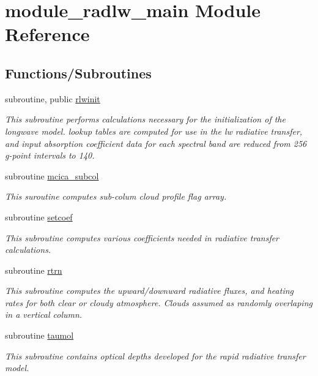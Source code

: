 \hypertarget{namespacemodule__radlw__main}{}\section{module\+\_\+radlw\+\_\+main Module Reference}
\label{namespacemodule__radlw__main}
\subsection*{Functions/\+Subroutines}
\begin{DoxyCompactItemize}
\item 
subroutine, public \hyperlink{group__module__radlw__main_ga916dc850de8c1d18ff9bfd6f63b65d30}{rlwinit}
\begin{DoxyCompactList}\small\item\em This subroutine performs calculations necessary for the initialization of the longwave model. lookup tables are computed for use in the lw radiative transfer, and input absorption coefficient data for each spectral band are reduced from 256 g-\/point intervals to 140. \end{DoxyCompactList}\item 
subroutine \hyperlink{group__module__radlw__main_ga378846d33b06ea00ba43d9c3b4c3a661}{mcica\+\_\+subcol}
\begin{DoxyCompactList}\small\item\em This suroutine computes sub-\/colum cloud profile flag array. \end{DoxyCompactList}\item 
subroutine \hyperlink{group__module__radlw__main_ga503a8d3f064dfb4cd4503ae98711bab8}{setcoef}
\begin{DoxyCompactList}\small\item\em This subroutine computes various coefficients needed in radiative transfer calculations. \end{DoxyCompactList}\item 
subroutine \hyperlink{group__module__radlw__main_gaa42d8cb56a431d3693d3db44733c11e3}{rtrn}
\begin{DoxyCompactList}\small\item\em This subroutine computes the upward/downward radiative fluxes, and heating rates for both clear or cloudy atmosphere. Clouds assumed as randomly overlaping in a vertical column. \end{DoxyCompactList}\item 
subroutine \hyperlink{group__module__radlw__main_gac2fa8768f0911fed5343f643953c780d}{taumol}
\begin{DoxyCompactList}\small\item\em This subroutine contains optical depths developed for the rapid radiative transfer model. \end{DoxyCompactList}\end{DoxyCompactItemize}
